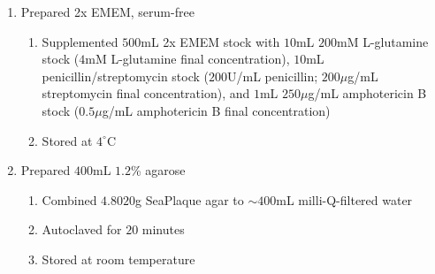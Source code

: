 \begin{enumerate}
	\item Prepared 2x EMEM, serum-free
		\begin{enumerate}
			\item Supplemented $500$mL 2x EMEM stock with $10$mL $200$mM L-glutamine stock ($4$mM L-glutamine final concentration), $10$mL penicillin/streptomycin stock ($200$U/mL penicillin; $200\mu$g/mL streptomycin final concentration), and $1$mL $250\mu$g/mL amphotericin B stock ($0.5\mu$g/mL amphotericin B final concentration)
			\item Stored at $4^{\circ}$C
		\end{enumerate}
	\item Prepared $400$mL $1.2$\% agarose
		\begin{enumerate}
			\item Combined $4.8020$g SeaPlaque agar to $\sim 400$mL milli-Q-filtered water
			\item Autoclaved for $20$ minutes
			\item Stored at room temperature
		\end{enumerate}
\end{enumerate}